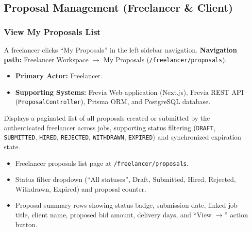 
\subsection{Proposal Management (Freelancer \& Client)}

\subsubsection{View My Proposals List}

A freelancer clicks ``My Proposals'' in the left sidebar navigation.\newline
\textbf{Navigation path:} Freelancer Workspace $\rightarrow$ My Proposals (\texttt{/freelancer/proposals}).


\begin{itemize}[leftmargin=1.6em,topsep=3pt,itemsep=2pt,parsep=0pt,label=$\bullet$]
    \item \textbf{Primary Actor:} Freelancer.
    \item \textbf{Supporting Systems:} Frevia Web application (Next.js), Frevia REST API (\texttt{ProposalController}), Prisma ORM, and PostgreSQL database.
\end{itemize}

\noindent Displays a paginated list of all proposals created or submitted by the authenticated freelancer across jobs, supporting status filtering (\texttt{DRAFT}, \texttt{SUBMITTED}, \texttt{HIRED}, \texttt{REJECTED}, \texttt{WITHDRAWN}, \texttt{EXPIRED}) and synchronized expiration state.

\begin{itemize}[leftmargin=1.6em,topsep=3pt,itemsep=2pt,parsep=0pt,label=$\bullet$]
    \item Freelancer proposals list page at \texttt{/freelancer/proposals}.
    \item Status filter dropdown (``All statuses'', Draft, Submitted, Hired, Rejected, Withdrawn, Expired) and proposal counter.
    \item Proposal summary rows showing status badge, submission date, linked job title, client name, proposed bid amount, delivery days, and ``View $\rightarrow$'' action button.
\end{itemize}

